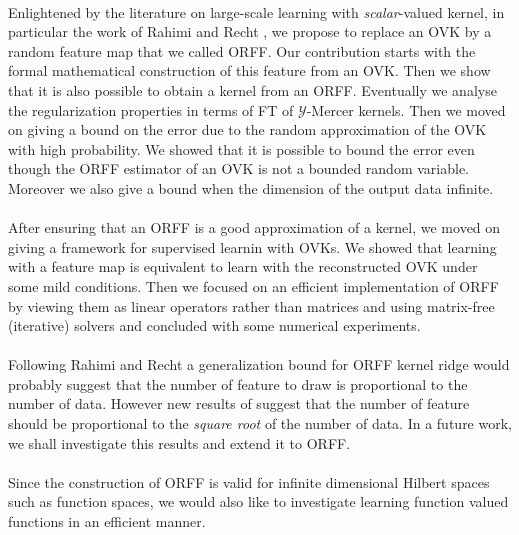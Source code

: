 \documentclass[twoside,11pt]{article}
\begin{document}
\paragraph{}
Enlightened by the literature on large-scale learning with
\emph{scalar}-valued kernel, in particular the work of Rahimi and Recht
\citep{Rahimi2007}, we propose to replace an \acs{OVK} by a random feature
map that we called \acl{ORFF}. Our contribution starts with the formal
mathematical construction of this feature from an \acs{OVK}. Then we show
that it is also possible to obtain a kernel from an \acs{ORFF}. Eventually
we analyse the regularization properties in terms of \acl{FT} of
$\mathcal{Y}$-Mercer kernels. Then we moved on giving a bound on the error
due to the random approximation of the \acs{OVK} with high probability.
We showed that it is possible to bound the error even though the \acs{ORFF}
estimator of an \acs{OVK} is not a bounded random variable. Moreover we
also give a bound when the dimension of the output data infinite.
\paragraph{}
After ensuring that an \acs{ORFF} is a good approximation of a kernel, we
moved on giving a framework for supervised learnin with \aclp{OVK}. We showed
that learning with a feature map is equivalent to learn with the reconstructed
\acs{OVK} under some mild conditions. Then we focused on an efficient
implementation of \acs{ORFF} by viewing them as linear operators rather than
matrices and using matrix-free (iterative) solvers and concluded with some
numerical experiments.
\paragraph{}
Following Rahimi and Recht a generalization bound for \acs{ORFF} kernel ridge
would probably suggest that the number of feature to draw is proportional to
the number of data.  However new results of \citet{rudi2016generalization}
suggest that the number of feature should be proportional to the \emph{square
root} of the number of data. In a future work, we shall investigate this
results and extend it to \acs{ORFF}.
\paragraph{}
Since the construction of \acs{ORFF} is valid for infinite dimensional Hilbert
spaces such as function spaces, we would also like to investigate learning
function valued functions in an efficient manner.




\appendix



\end{document}
